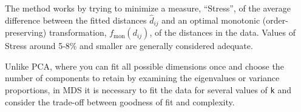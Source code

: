 \documentclass[
  letterpaper,
  10pt,
  krantz2]{krantz}
\makeatletter
\newenvironment{Shaded}{\begin{snugshade}}{\end{snugshade}}
\newcommand{\AttributeTok}[1]{\textcolor[rgb]{0.40,0.45,0.13}{#1}}
\newcommand{\CommentTok}[1]{\textcolor[rgb]{0.37,0.37,0.37}{#1}}
\newcommand{\ConstantTok}[1]{\textcolor[rgb]{0.56,0.35,0.01}{#1}}
\newcommand{\DecValTok}[1]{\textcolor[rgb]{0.68,0.00,0.00}{#1}}
\newcommand{\FunctionTok}[1]{\textcolor[rgb]{0.28,0.35,0.67}{#1}}
\newcommand{\NormalTok}[1]{\textcolor[rgb]{0.00,0.23,0.31}{#1}}
\newcommand{\OtherTok}[1]{\textcolor[rgb]{0.00,0.23,0.31}{#1}}
\newcommand{\SpecialCharTok}[1]{\textcolor[rgb]{0.37,0.37,0.37}{#1}}
\newcommand{\StringTok}[1]{\textcolor[rgb]{0.13,0.47,0.30}{#1}}
\newenvironment{kframe}{%
  \medskip{}
  \setlength{\fboxsep}{.8em}
  \def\at@end@of@kframe{}%
  \ifinner\ifhmode%
  \def\at@end@of@kframe{\end{minipage}}%
  \begin{minipage}{\columnwidth}%
  \fi\fi%
  \def\FrameCommand##1{\hskip\@totalleftmargin \hskip-\fboxsep
  \colorbox{shadecolor}{##1}\hskip-\fboxsep
      \hskip-\linewidth \hskip-\@totalleftmargin \hskip\columnwidth}%
  \MakeFramed {\advance\hsize-\width
    \@totalleftmargin\z@ \linewidth\hsize
    \@setminipage}}%
{\par\unskip\endMakeFramed%
  \at@end@of@kframe}
\renewenvironment{Shaded}{\begin{kframe}}{\end{kframe}}
\makeatother
\begin{document}
\begin{Shaded}
\end{Shaded}

The method works by trying to minimize a measure, ``Stress'', of the
average difference between the fitted distances \(\hat{d}_{ij}\) and an
optimal monotonic (order-preserving) transformation,
\(f_{\text{mon}}(d_{ij})\), of the distances in the data. Values of
Stress around 5-8\% and smaller are generally considered adequate.

Unlike PCA, where you can fit all possible dimensions once and choose
the number of components to retain by examining the eigenvalues or
variance proportions, in MDS it is necessary to fit the data for several
values of \texttt{k} and consider the trade-off between goodness of fit
and complexity.
\end{document}
